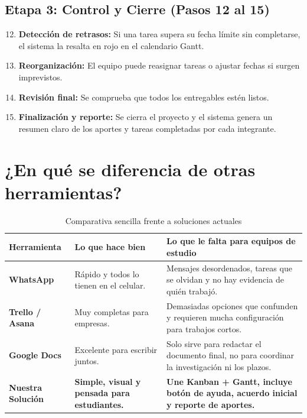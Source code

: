 \documentclass[11pt,a4paper]{article}
\begin{document}
\subsection{Etapa 3: Control y Cierre (Pasos 12 al 15)}
\begin{enumerate}
    \setcounter{enumi}{11}
    \item \textbf{Detección de retrasos:} Si una tarea supera su fecha límite sin completarse, el sistema la resalta en rojo en el calendario Gantt.
    \item \textbf{Reorganización:} El equipo puede reasignar tareas o ajustar fechas si surgen imprevistos.
    \item \textbf{Revisión final:} Se comprueba que todos los entregables estén listos.
    \item \textbf{Finalización y reporte:} Se cierra el proyecto y el sistema genera un resumen claro de los aportes y tareas completadas por cada integrante.
\end{enumerate}

\section{¿En qué se diferencia de otras herramientas?}

\begin{table}[htbp]
\centering
\small
\caption{Comparativa sencilla frente a soluciones actuales}
\begin{tabularx}{\textwidth}{l p{4.2cm} X}
\toprule
\textbf{Herramienta} & \textbf{Lo que hace bien} & \textbf{Lo que le falta para equipos de estudio} \\
\midrule
\textbf{WhatsApp} & Rápido y todos lo tienen en el celular. & Mensajes desordenados, tareas que se olvidan y no hay evidencia de quién trabajó. \\
\textbf{Trello / Asana} & Muy completas para empresas. & Demasiadas opciones que confunden y requieren mucha configuración para trabajos cortos. \\
\textbf{Google Docs} & Excelente para escribir juntos. & Solo sirve para redactar el documento final, no para coordinar la investigación ni los plazos. \\
\midrule
\textbf{Nuestra Solución} & \textbf{Simple, visual y pensada para estudiantes.} & \textbf{Une Kanban + Gantt, incluye botón de ayuda, acuerdo inicial y reporte de aportes.} \\
\bottomrule
\end{tabularx}
\end{table}
\end{document}
